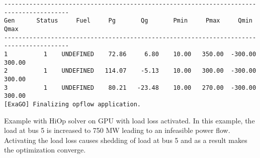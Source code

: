 \begin{lstlisting}
----------------------------------------------------------------------------------------
Gen      Status     Fuel     Pg       Qg       Pmin     Pmax     Qmin     Qmax  
----------------------------------------------------------------------------------------
1          1    UNDEFINED    72.86     6.80    10.00   350.00  -300.00   300.00
2          1    UNDEFINED   114.07    -5.13    10.00   300.00  -300.00   300.00
3          1    UNDEFINED    80.21   -23.48    10.00   270.00  -300.00   300.00
[ExaGO] Finalizing opflow application.
\end{lstlisting}

Example with HiOp solver on GPU with load loss activated. In this example, the load at bus 5 is
increased to 750 MW leading to an infeasible power flow. Activating the load loss causes shedding
of load at bus 5 and as a result makes the optimization converge.

